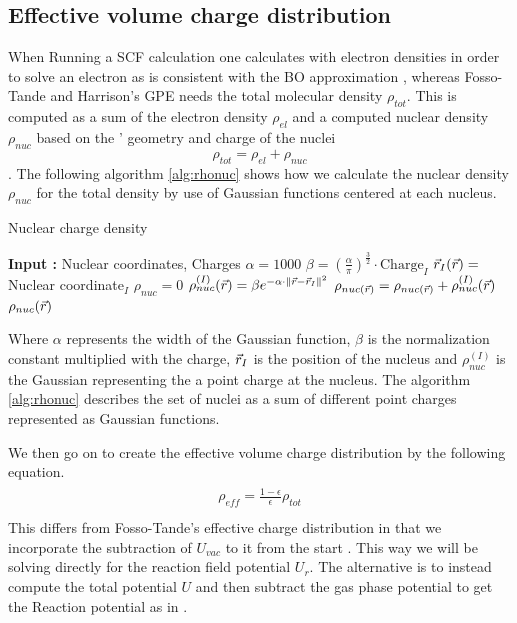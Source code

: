 \documentclass[../master_thesis.tex]{subfiles}
\begin{document}
\subsection{Effective volume charge distribution}
When Running a \ac{SCF} calculation one calculates with electron densities in order
to solve an electron \SE as is consistent with the \ac{BO} approximation
\cite{Cramer:2004, Konishi:2009}, whereas Fosso-Tande and Harrison's \ac{GPE}
needs the total molecular density $\rho_{tot}$. This is computed as a sum of the electron
density $\rho_{el}$ and a computed nuclear density $\rho_{nuc}$ based on the '
geometry and charge of the nuclei
\begin{equation}
  \rho_{tot} = \rho_{el} + \rho_{nuc}
\end{equation}.
The following algorithm \ref{alg:rhonuc} shows how we calculate the nuclear
density $\rho_{nuc}$ for the total density by use of Gaussian functions centered at
each nucleus.
\begin{algorithm}
  \caption{Nuclear charge density}\label{alg:rhonuc}
  \begin{algorithmic}
    \STATE \textbf{Input :} Nuclear coordinates, Charges
    \STATE $\alpha = 1000$
    \STATE $\beta = (\frac{\alpha}{\pi})^{\frac{3}{2}} \cdot \text{Charge}_I$
    \STATE $\vec{r}_I(\vec{r}) =$ Nuclear coordinate$_I$
    \STATE $\rho_{nuc} = 0$
    \STATE $\rho_{nuc}^{(I)}(\vec{r}) = \beta e^{-\alpha\cdot\lVert\vec{r} -\vec{r}_I\rVert^2}$
    \STATE $\rho_{nuc(\vec{r})} = \rho_{nuc(\vec{r})} + \rho_{nuc}^{(I)}(\vec{r})$
    \ENDFOR
    \RETURN $\rho_{nuc}(\vec{r})$
  \end{algorithmic}
\end{algorithm}

Where $\alpha$ represents the width of the Gaussian function, $\beta$ is the normalization
constant multiplied with the charge, $\vec{r}_I$ is the position of the nucleus and
$\rho_{nuc}^{(I)}$ is the Gaussian representing the a point charge at the nucleus.
The algorithm \ref{alg:rhonuc} describes the set of nuclei as a sum of different point charges
represented as Gaussian functions.

We then go on to create the effective volume charge distribution by the following equation.
\begin{align}
    \begin{split}
      \rho_{eff} = \frac{1 - \epsilon}{\epsilon}\rho_{tot}\\
    \end{split}
\end{align}
This differs from Fosso-Tande's effective charge distribution in that we incorporate
the subtraction of $U_{vac}$ to it from the start \cite{FossoTande:2013ka}. This
way we will be solving directly for the reaction field potential $U_r$.
The alternative is to instead compute the total potential $U$ and then subtract
the gas phase potential to get the Reaction potential as in \cite{FossoTande:2013ka}.
\end{document}
